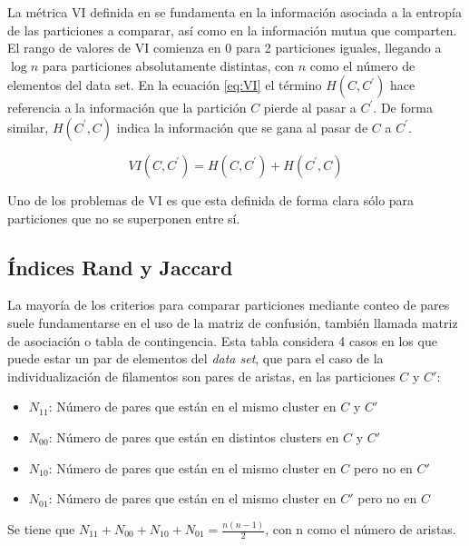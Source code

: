 La m\'etrica VI definida en \cite{meilua2007comparing} se fundamenta en la informaci\'on asociada a la entrop\'ia de las particiones a comparar, as\'i como en la informaci\'on mutua que comparten. El rango de valores de VI comienza en 0 para 2 particiones iguales, llegando a $\log n$ para particiones absolutamente distintas, con $n$ como el n\'umero de elementos del data set. En la ecuaci\'on \eqref{eq:VI} el t\'ermino $H(C,C^{\prime})$ hace referencia a la informaci\'on que la partici\'on $C$ pierde al pasar a $C^{\prime}$. De forma similar, $H(C^{\prime},C)$ indica la informaci\'on que se gana al pasar de $C$ a $C^{\prime}$.

\begin{equation}
VI(C,C^{\prime}) = H(C,C^{\prime}) + H(C^{\prime},C)
\label{eq:VI}
\end{equation}

Uno de los problemas de VI es que esta definida de forma clara s\'olo para particiones que no se superponen entre s\'i\cite{breuer2015define}.

\subsection{\'Indices Rand y Jaccard}

La mayor\'ia de los criterios para comparar particiones mediante conteo de pares suele fundamentarse en el uso de la matriz de confusi\'on, tambi\'en llamada matriz de asociaci\'on o tabla de contingencia\cite{meilua2007comparing}. Esta tabla considera 4 casos en los que puede estar un par de elementos del {\it data set}, que para el caso de la individualizaci\'on de filamentos son pares de aristas, en las particiones $C$ y $C'$:

\begin{itemize}
    \item $N_{11}$: N\'umero de pares que est\'an en el mismo cluster en $C$ y $C'$
    \item $N_{00}$: N\'umero de pares que est\'an en distintos clusters en $C$ y $C'$
    \item $N_{10}$: N\'umero de pares que est\'an en el mismo cluster en $C$ pero no en $C'$
    \item $N_{01}$: N\'umero de pares que est\'an en el mismo cluster en $C'$ pero no en $C$
\end{itemize}

Se tiene que $N_{11} + N_{00} + N_{10} + N_{01} = \frac{n(n-1)}{2}$, con n como el n\'umero de aristas.

